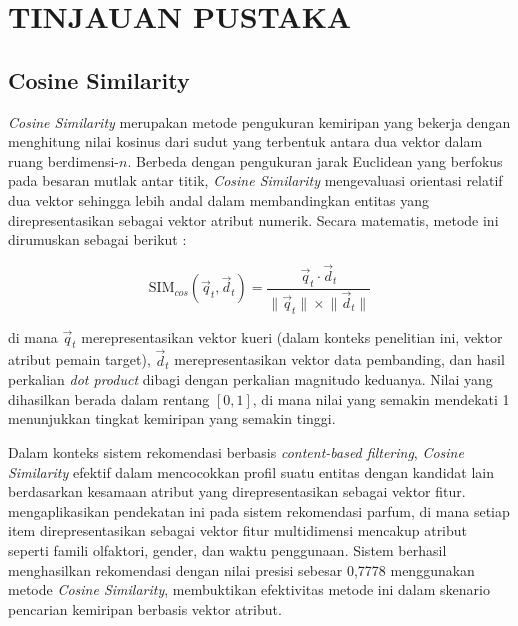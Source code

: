 \chapter{TINJAUAN PUSTAKA}
\label{bab:tinjauan-pustaka}

\section{Cosine Similarity}
\label{sec:cosine-similarity}

\emph{Cosine Similarity} merupakan metode pengukuran kemiripan yang bekerja dengan menghitung nilai kosinus dari sudut yang terbentuk antara dua vektor dalam ruang berdimensi-$n$. Berbeda dengan pengukuran jarak Euclidean yang berfokus pada besaran mutlak antar titik, \emph{Cosine Similarity} mengevaluasi orientasi relatif dua vektor sehingga lebih andal dalam membandingkan entitas yang direpresentasikan sebagai vektor atribut numerik. Secara matematis, metode ini dirumuskan sebagai berikut \parencite{nurmuthia2025}:

\begin{equation}
  \mathrm{SIM}_{cos}(\vec{q}_t, \vec{d}_t) = \frac{\vec{q}_t \cdot \vec{d}_t}{\lVert \vec{q}_t \rVert \times \lVert \vec{d}_t \rVert}
  \label{eq:cosine}
\end{equation}

\noindent di mana $\vec{q}_t$ merepresentasikan vektor kueri (dalam konteks penelitian ini, vektor atribut pemain target), $\vec{d}_t$ merepresentasikan vektor data pembanding, dan hasil perkalian \emph{dot product} dibagi dengan perkalian magnitudo keduanya. Nilai yang dihasilkan berada dalam rentang $[0, 1]$, di mana nilai yang semakin mendekati 1 menunjukkan tingkat kemiripan yang semakin tinggi.

Dalam konteks sistem rekomendasi berbasis \emph{content-based filtering}, \emph{Cosine Similarity} efektif dalam mencocokkan profil suatu entitas dengan kandidat lain berdasarkan kesamaan atribut yang direpresentasikan sebagai vektor fitur. \textcite{nurmuthia2025} mengaplikasikan pendekatan ini pada sistem rekomendasi parfum, di mana setiap item direpresentasikan sebagai vektor fitur multidimensi mencakup atribut seperti famili olfaktori, gender, dan waktu penggunaan. Sistem berhasil menghasilkan rekomendasi dengan nilai presisi sebesar 0,7778 menggunakan metode \emph{Cosine Similarity}, membuktikan efektivitas metode ini dalam skenario pencarian kemiripan berbasis vektor atribut.

